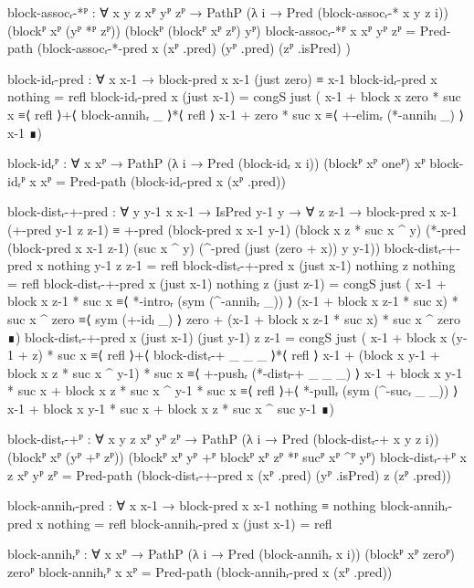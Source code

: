 \begin{code}[hide]
  block-assocᵣ-*ᴾ :
    ∀ {x y z} xᴾ yᴾ zᴾ →
    PathP (λ i → Pred (block-assocᵣ-* x y z i))
      (blockᴾ xᴾ (yᴾ *ᴾ zᴾ)) (blockᴾ (blockᴾ xᴾ zᴾ) yᴾ)
  block-assocᵣ-*ᴾ {x} xᴾ yᴾ zᴾ =
    Pred-path (block-assocᵣ-*-pred x (xᴾ .pred) (yᴾ .pred) (zᴾ .isPred) )

  block-idᵣ-pred : ∀ x x-1 → block-pred x x-1 (just zero) ≡ x-1
  block-idᵣ-pred x nothing = refl
  block-idᵣ-pred x (just x-1) =
    congS just
      ( x-1 + block x zero * suc x ≡⟨ refl ⟩+⟨ block-annihᵣ _ ⟩*⟨ refl ⟩
        x-1 + zero * suc x         ≡⟨ +-elimᵣ (*-annihₗ _) ⟩
        x-1                        ∎)

  block-idᵣᴾ : ∀ {x} xᴾ → PathP (λ i → Pred (block-idᵣ x i)) (blockᴾ xᴾ oneᴾ) xᴾ
  block-idᵣᴾ {x} xᴾ = Pred-path (block-idᵣ-pred x (xᴾ .pred))

  block-distᵣ-+-pred :
    ∀ {y y-1} x x-1 → IsPred y-1 y → ∀ z z-1 →
    block-pred x x-1 (+-pred y-1 z z-1) ≡
    +-pred
      (block-pred x x-1 y-1)
      (block x z * suc x ^ y)
      (*-pred
        (block-pred x x-1 z-1)
        (suc x ^ y)
        (^-pred (just (zero + x)) y y-1))
  block-distᵣ-+-pred x nothing y-1 z z-1 = refl
  block-distᵣ-+-pred x (just x-1) nothing z nothing = refl
  block-distᵣ-+-pred x (just x-1) nothing z (just z-1) =
    congS just
      ( x-1 + block x z-1 * suc x                         ≡⟨ *-introᵣ (sym (^-annihᵣ _)) ⟩
        (x-1 + block x z-1 * suc x) * suc x ^ zero        ≡⟨ sym (+-idₗ _) ⟩
        zero + (x-1 + block x z-1 * suc x) * suc x ^ zero ∎)
  block-distᵣ-+-pred x (just x-1) (just y-1) z z-1 =
    congS just
      ( x-1 + block x (y-1 + z) * suc x                             ≡⟨ refl ⟩+⟨ block-distᵣ-+ _ _ _ ⟩*⟨ refl ⟩
        x-1 + (block x y-1 + block x z * suc x ^ y-1) * suc x       ≡⟨ +-pushᵣ (*-distₗ-+ _ _ _) ⟩
        x-1 + block x y-1 * suc x + block x z * suc x ^ y-1 * suc x ≡⟨ refl ⟩+⟨ *-pullᵣ (sym (^-sucᵣ _ _)) ⟩
        x-1 + block x y-1 * suc x + block x z * suc x ^ suc y-1     ∎)

  block-distᵣ-+ᴾ :
    ∀ {x y z} xᴾ yᴾ zᴾ →
    PathP (λ i → Pred (block-distᵣ-+ x y z i))
      (blockᴾ xᴾ (yᴾ +ᴾ zᴾ)) (blockᴾ xᴾ yᴾ +ᴾ blockᴾ xᴾ zᴾ *ᴾ sucᴾ xᴾ ^ᴾ yᴾ)
  block-distᵣ-+ᴾ {x} {z} xᴾ yᴾ zᴾ =
    Pred-path (block-distᵣ-+-pred x (xᴾ .pred) (yᴾ .isPred) z (zᴾ .pred))

  block-annihᵣ-pred : ∀ x x-1 → block-pred x x-1 nothing ≡ nothing
  block-annihᵣ-pred x nothing = refl
  block-annihᵣ-pred x (just x-1) = refl

  block-annihᵣᴾ :
    ∀ {x} xᴾ → PathP (λ i → Pred (block-annihᵣ x i)) (blockᴾ xᴾ zeroᴾ) zeroᴾ
  block-annihᵣᴾ {x} xᴾ = Pred-path (block-annihᵣ-pred x (xᴾ .pred))


\end{code}
